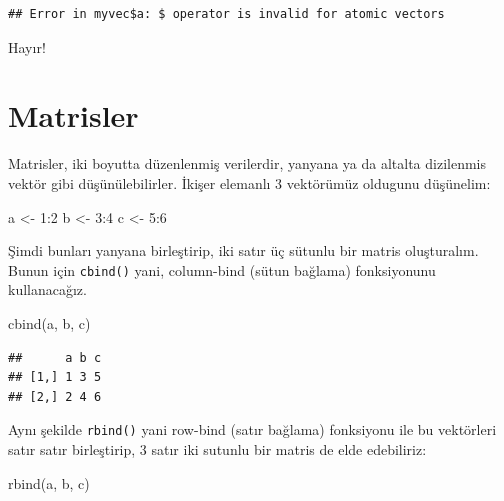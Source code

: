 \documentclass[
]{book}
\newenvironment{Shaded}{\begin{snugshade}}{\end{snugshade}}
\newcommand{\DecValTok}[1]{\textcolor[rgb]{0.00,0.00,0.81}{#1}}
\newcommand{\FunctionTok}[1]{\textcolor[rgb]{0.00,0.00,0.00}{#1}}
\newcommand{\NormalTok}[1]{#1}
\newcommand{\OtherTok}[1]{\textcolor[rgb]{0.56,0.35,0.01}{#1}}
\newcommand{\SpecialCharTok}[1]{\textcolor[rgb]{0.00,0.00,0.00}{#1}}
\begin{document}
\begin{Shaded}
\end{Shaded}

\begin{verbatim}
## Error in myvec$a: $ operator is invalid for atomic vectors
\end{verbatim}

Hayır!

\hypertarget{matrisler}{%
\chapter{Matrisler}\label{matrisler}}

Matrisler, iki boyutta düzenlenmiş verilerdir, yanyana ya da altalta dizilenmis vektör gibi düşünülebilirler. İkişer elemanlı 3 vektörümüz oldugunu düşünelim:

\begin{Shaded}
\begin{Highlighting}[]
\NormalTok{a }\OtherTok{\textless{}{-}} \DecValTok{1}\SpecialCharTok{:}\DecValTok{2}
\NormalTok{b }\OtherTok{\textless{}{-}} \DecValTok{3}\SpecialCharTok{:}\DecValTok{4}
\NormalTok{c }\OtherTok{\textless{}{-}} \DecValTok{5}\SpecialCharTok{:}\DecValTok{6}
\end{Highlighting}
\end{Shaded}

Şimdi bunları yanyana birleştirip, iki satır üç sütunlu bir matris oluşturalım. Bunun için \texttt{cbind()} yani, column-bind (sütun bağlama) fonksiyonunu kullanacağız.

\begin{Shaded}
\begin{Highlighting}[]
\FunctionTok{cbind}\NormalTok{(a, b, c)}
\end{Highlighting}
\end{Shaded}

\begin{verbatim}
##      a b c
## [1,] 1 3 5
## [2,] 2 4 6
\end{verbatim}

Aynı şekilde \texttt{rbind()} yani row-bind (satır bağlama) fonksiyonu ile bu vektörleri satır satır birleştirip, 3 satır iki sutunlu bir matris de elde edebiliriz:

\begin{Shaded}
\begin{Highlighting}[]
\FunctionTok{rbind}\NormalTok{(a, b, c)}
\end{Highlighting}
\end{Shaded}
\end{document}
